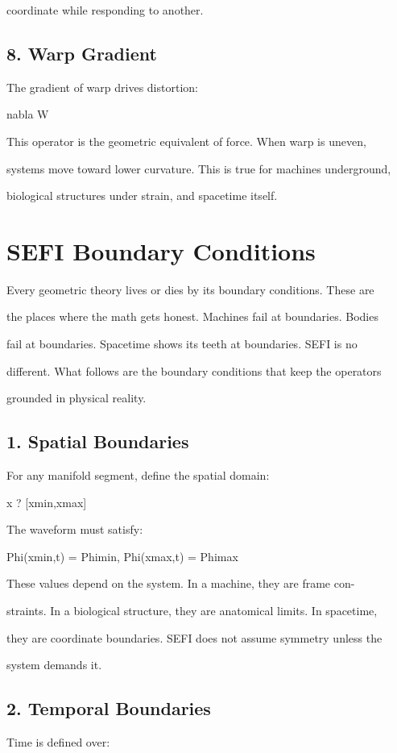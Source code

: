 \documentclass[10pt]{article}
\begin{document}
coordinate while responding to another.

\subsection*{8. Warp Gradient}
The gradient of warp drives distortion:

nabla W

This operator is the geometric equivalent of force. When warp is uneven,

systems move toward lower curvature. This is true for machines underground,

biological structures under strain, and spacetime itself.

\section*{SEFI Boundary Conditions}
Every geometric theory lives or dies by its boundary conditions. These are

the places where the math gets honest. Machines fail at boundaries. Bodies

fail at boundaries. Spacetime shows its teeth at boundaries. SEFI is no

different. What follows are the boundary conditions that keep the operators

grounded in physical reality.

\subsection*{1. Spatial Boundaries}
For any manifold segment, define the spatial domain:

x ? [xmin,xmax]

The waveform must satisfy:

Phi(xmin,t) = Phimin, Phi(xmax,t) = Phimax

These values depend on the system. In a machine, they are frame con-

straints. In a biological structure, they are anatomical limits. In spacetime,

they are coordinate boundaries. SEFI does not assume symmetry unless the

system demands it.


\subsection*{2. Temporal Boundaries}
Time is defined over:
\end{document}
